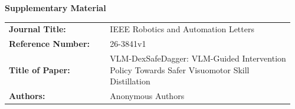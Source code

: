 \documentclass[10pt]{article}
\newcommand{\manuscriptid}{26-3841v1}
\newcommand{\papertitle}{VLM-DexSafeDagger: VLM-Guided Intervention Policy Towards Safer Visuomotor Skill Distillation}
\begin{document}
\begin{center}
  {\Large\bfseries Supplementary Material}\par
\end{center}

\vspace{2em}
\begin{tabular}{@{}p{0.34\linewidth}p{0.62\linewidth}@{}}
\textbf{Journal Title:} & IEEE Robotics and Automation Letters \\
\textbf{Reference Number:} & \manuscriptid \\
\textbf{Title of Paper:} & \papertitle \\
\textbf{Authors:} & Anonymous Authors
\end{tabular}

\vspace{2em}
\appendix

\end{document}
